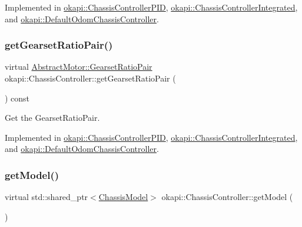 Implemented in \mbox{\hyperlink{classokapi_1_1ChassisControllerPID_a75f4e1b26f2440ac4066fd740dee7b13}{okapi\+::\+Chassis\+Controller\+P\+ID}}, \mbox{\hyperlink{classokapi_1_1ChassisControllerIntegrated_a6bbab5d22753736b0507d5fd4deb3982}{okapi\+::\+Chassis\+Controller\+Integrated}}, and \mbox{\hyperlink{classokapi_1_1DefaultOdomChassisController_afa07913b30d47c790fcdce8c2b85a468}{okapi\+::\+Default\+Odom\+Chassis\+Controller}}.

\mbox{\label{classokapi_1_1ChassisController_aa19351888b997d4a6596dac24520ebff}} 
\subsubsection{\texorpdfstring{getGearsetRatioPair()}{getGearsetRatioPair()}}
{\footnotesize\ttfamily virtual \mbox{\hyperlink{structokapi_1_1AbstractMotor_1_1GearsetRatioPair}{Abstract\+Motor\+::\+Gearset\+Ratio\+Pair}} okapi\+::\+Chassis\+Controller\+::get\+Gearset\+Ratio\+Pair (\begin{DoxyParamCaption}{ }\end{DoxyParamCaption}) const\hspace{0.3cm}{\ttfamily [pure virtual]}}

Get the Gearset\+Ratio\+Pair. 

Implemented in \mbox{\hyperlink{classokapi_1_1ChassisControllerPID_a50673f2911c969e2f6e89b02a29ce582}{okapi\+::\+Chassis\+Controller\+P\+ID}}, \mbox{\hyperlink{classokapi_1_1ChassisControllerIntegrated_a42cab9878235cdb4bea46e69f7ccd75d}{okapi\+::\+Chassis\+Controller\+Integrated}}, and \mbox{\hyperlink{classokapi_1_1DefaultOdomChassisController_a6912dbe99776f79fb3a6990e2fbea2ff}{okapi\+::\+Default\+Odom\+Chassis\+Controller}}.

\mbox{\label{classokapi_1_1ChassisController_a1971d4b54b61718437824c026aca53c9}} 
\subsubsection{\texorpdfstring{getModel()}{getModel()}}
{\footnotesize\ttfamily virtual std\+::shared\+\_\+ptr$<$\mbox{\hyperlink{classokapi_1_1ChassisModel}{Chassis\+Model}}$>$ okapi\+::\+Chassis\+Controller\+::get\+Model (\begin{DoxyParamCaption}{ }\end{DoxyParamCaption})\hspace{0.3cm}{\ttfamily [pure virtual]}}

